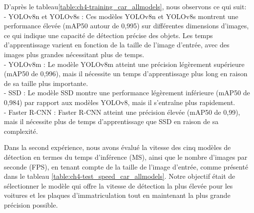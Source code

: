 D'après le tableau\ref{table:ch4-training_car_allmodels}, nous observons ce qui suit:\\
- YOLOv8n et YOLOv8s : Ces modèles YOLOv8n et YOLOv8s montrent une performance élevée (mAP50 autour de 0,995) sur différentes dimensions d'images, ce qui indique une capacité de détection précise des objets. Les temps d'apprentissage varient en fonction de la taille de l'image d'entrée, avec des images plus grandes nécessitant plus de temps.\\
- YOLOv8m : Le modèle YOLOv8m atteint une précision légèrement supérieure (mAP50 de 0,996), mais il nécessite un temps d'apprentissage plus long en raison de sa taille plus importante.\\
- SSD : Le modèle SSD montre une performance légèrement inférieure (mAP50 de 0,984) par rapport aux modèles YOLOv8, mais il s'entraîne plus rapidement.\\
- Faster R-CNN : Faster R-CNN atteint une précision élevée (mAP50 de 0,99), mais il nécessite plus de temps d'apprentissage que SSD en raison de sa complexité.

Dans la second expérience, nous avons évalué la vitesse des cinq modèles de détection en termes du temps d'inférence (MS), ainsi que le nombre d'images par seconde (FPS), en tenant compte de la taille de l'image d'entrée, comme présenté dans le tableau \ref{table:ch4-test_speed_car_allmodels}. 
Notre objectif était de sélectionner le modèle qui offre la vitesse de détection la plus élevée pour les voitures et les plaques d'immatriculation tout en maintenant la plus grande précision possible.

